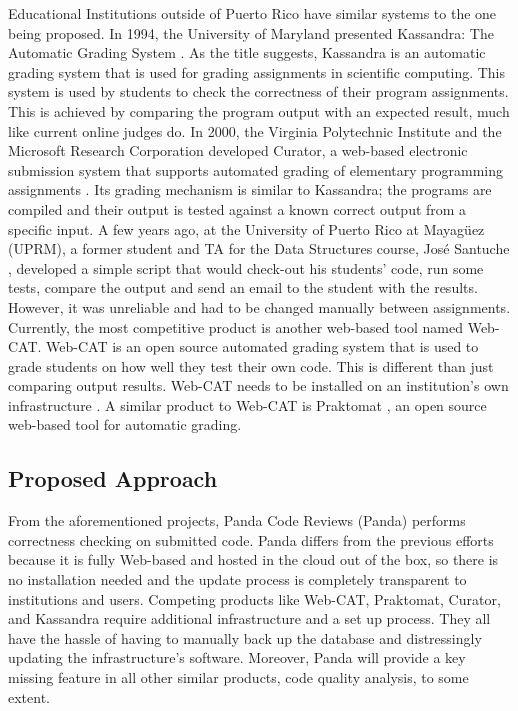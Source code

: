 Educational Institutions outside of Puerto Rico have similar systems to the one
being proposed. In 1994, the University of Maryland presented Kassandra: The
Automatic Grading System \cite{Matt1994}. As the title suggests, Kassandra is an
automatic grading system that is used for grading assignments in scientific
computing. This system is used by students to check the correctness of their
program assignments. This is achieved by comparing the program output with an
expected result, much like current online judges do. In 2000, the Virginia
Polytechnic Institute and the Microsoft Research Corporation developed Curator,
a web-based electronic submission system that supports automated grading of
elementary programming assignments \cite{Curator}. Its grading mechanism is
similar to Kassandra; the programs are compiled and their output is tested
against a known correct output from a specific input. A few years ago, at the
University of Puerto Rico at Mayagüez (UPRM), a former student and TA for the
Data  Structures course, José Santuche \cite{Santuche}, developed a simple
script that would check-out his students' code, run some tests, compare the
output and send an email to the student with the results. However, it was
unreliable and had to be changed manually between assignments. Currently, the
most competitive product is another web-based tool named Web-CAT. Web-CAT is an
open source automated grading system that is used to grade students on how well
they test their own code. This is different than just comparing output results.
Web-CAT needs to be installed on an institution's own infrastructure
\cite{WebCat}. A similar product to Web-CAT is Praktomat \cite{Praktomat}, an
open source web-based tool for automatic grading.

\subsection{Proposed Approach}

From the aforementioned projects, Panda Code Reviews (Panda) performs
correctness checking on submitted code. Panda differs from the previous efforts
because it is fully Web-based and hosted in the cloud out of the box, so there
is no installation needed and the update process is completely transparent to
institutions and users. Competing products like Web-CAT, Praktomat, Curator, and
Kassandra require additional infrastructure and a set up process. They all have
the hassle of having to manually back up the database and distressingly updating
the infrastructure's software. Moreover, Panda will provide a key missing
feature in all other similar products, code quality analysis, to some extent.

